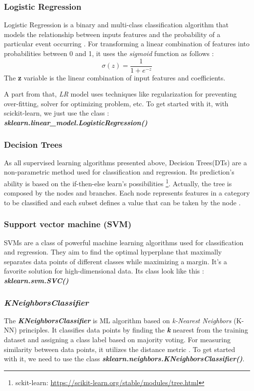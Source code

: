 \documentclass[12pt,a4paper]{report}
\begin{document}
\subsubsection{Logistic Regression} 
Logistic Regression is a binary and multi-class classification algorithm that models the relationship between inputs features and the probability of a particular event occurring \cite{rymarczyk2019logistic}. For transforming a linear combination of features into probabilities between 0 and 1, it uses the \textit{sigmoid} function as follows :
\begin{equation} 
\label{sigmoidFunction}
\sigma(z) = \frac{1}{1 + e^{-z}}
\end{equation} 
The \textbf{z} variable is the linear combination of input features and coefficients. 

A part from that, \textit{LR} model uses techniques like regularization for preventing over-fitting, solver for optimizing problem, etc.
To get started with it, with scickit-learn, we just use the class :
\textbf{\textit{sklearn.linear\_model.LogisticRegression()}} 

\subsubsection{Decision Trees} 
As all supervised learning algorithms presented above, Decision Trees(DTs) are a non-parametric method used for classification and regression. Its prediction's ability is based on the if-then-else learn's possibilities \footnote{sckit-learn: \url{https://scikit-learn.org/stable/modules/tree.html} }. Actually, the tree is composed by the nodes and branches. Each node represents features in a category to be classified and each subset defines a value that can be taken by the node \cite{charbuty2021classification}.  
\subsubsection{Support vector machine (SVM)} 
SVMs are a class of powerful machine learning algorithms used for classification and regression. They aim to find the optimal hyperplane that maximally separates data points of different classes while maximizing a margin. It's a favorite solution for high-dimensional data\cite{memoireUniversitySpam}. Its class look like this : \textbf{\textit{sklearn.svm.SVC()}}

\subsubsection{\textit{KNeighborsClassifier}}
The \textbf{\textit{KNeighborsClassifier}} is ML algorithm based on \textit{k-Nearest Neighbors} (K-NN) principles. It classifies data points by finding the \textbf{\textit{k}} nearest from the training dataset and assigning a class label based on majority voting. For measuring similarity between data points, it utilizes the distance metric \cite{nayak2022study}. 
To get started with it, we need to use the class\textbf{ \textit{sklearn.neighbors.KNeighborsClassifier()}}. 
\end{document}
